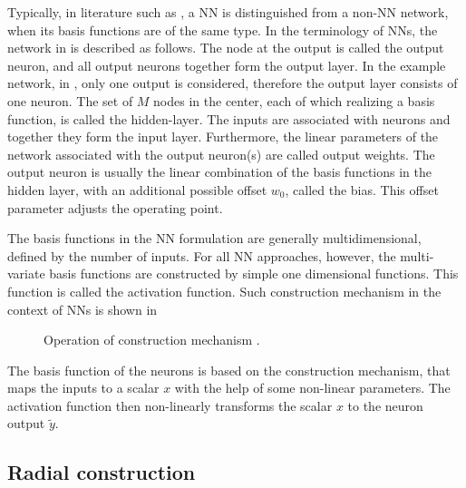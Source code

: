 \vspace{-3mm}

Typically, in literature such as \cite{nelles2013nonlinear, norgaard2003neural}, a NN is distinguished from a non-NN network, when its basis functions are of the same type. In the terminology of NNs, the network in  is described as follows. The node at the output is called the output neuron, and all output neurons together form the output layer. In the example network, in , only one output is considered, therefore the output layer consists of one neuron. The set of $M$ nodes in the center, each of which realizing a basis function, is called the hidden-layer. The inputs are associated with neurons and together they form the input layer. Furthermore, the linear parameters of the network associated with the output neuron(s) are called output weights. The output neuron is usually the linear combination of the basis functions in the hidden layer, with an additional possible offset $w_0$, called the bias. This offset parameter adjusts the operating point. 

The basis functions in the NN formulation are generally multidimensional, defined by the number of inputs. For all NN approaches, however, the multi-variate basis functions are constructed by simple one dimensional functions\cite{nelles2013nonlinear}. This function is called the activation function. Such construction mechanism in the context of NNs is shown in 

\begin{figure}[H]
\centering
 
\caption{Operation of construction mechanism \cite{nelles2013nonlinear}.}
\label{fig:activation_mechanism}
\end{figure}

\vspace{-3mm}

The basis function of the neurons is based on the construction mechanism, that maps the inputs to a scalar $x$ with the help of some non-linear parameters. The activation function then non-linearly transforms the scalar $x$ to the neuron output $\tilde{y}$. 

\subsection{Radial construction}
\label{radial construction}

